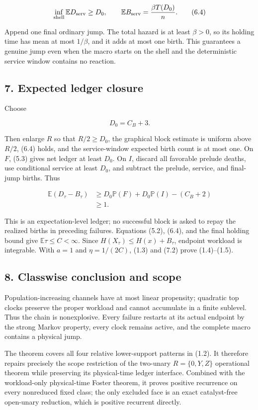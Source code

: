 \[
              \inf_{\rm shell}\mathbb E D_{\rm serv}\ge D_0,
              \qquad
              \mathbb E B_{\rm serv}=\frac{\beta T(D_0)}n.          \tag{6.4}
\]

Append one final ordinary jump. The total hazard is at least
\(\beta>0\), so its holding time has mean at most \(1/\beta\), and it
adds at most one birth. This guarantees a genuine jump even when the
macro starts on the shell and the deterministic service window contains
no reaction.

\subsection{7. Expected ledger closure}

Choose

\[
                              D_0=C_B+3.               \tag{7.1}
\]

Then enlarge \(R\) so that \(R/2\ge D_0\), the graphical block estimate
is uniform above \(R/2\), (6.4) holds, and the service-window expected
birth count is at most one. On \(F\), (5.3) gives net ledger at least
\(D_0\). On \(I\), discard all favorable prelude deaths, use conditional
service at least \(D_0\), and subtract the prelude, service, and
final-jump births. Thus

\[
\begin{aligned}
 \mathbb E(D_\tau-B_\tau)
 &\ge D_0\mathbb P(F)+D_0\mathbb P(I)-(C_B+2)\\
 &\ge1.
\end{aligned}
\tag{7.2}
\]

This is an expectation-level ledger; no successful block is asked to
repay the realized births in preceding failures. Equations (5.2), (6.4),
and the final holding bound give \(\mathbb E\tau\le C<\infty\). Since
\(H(X_\tau)\le H(x)+B_\tau\), endpoint workload is integrable. With
\(a=1\) and \(\eta=1/(2C)\), (1.3) and (7.2) prove (1.4)--(1.5).

\subsection{8. Classwise conclusion and
scope}

Population-increasing channels have at most linear propensity; quadratic
top clocks preserve the proper workload and cannot accumulate in a
finite sublevel. Thus the chain is nonexplosive. Every failure restarts
at its actual endpoint by the strong Markov property, every clock
remains active, and the complete macro contains a physical jump.

The theorem covers all four relative lower-support patterns in (1.2). It
therefore repairs precisely the scope restriction of the two-unary
\(R=\{0,Y,Z\}\) operational theorem while preserving its physical-time
ledger interface. Combined with the workload-only physical-time Foster
theorem, it proves positive recurrence on every nonreduced fixed class;
the only excluded face is an exact catalyst-free open-unary reduction,
which is positive recurrent directly.
